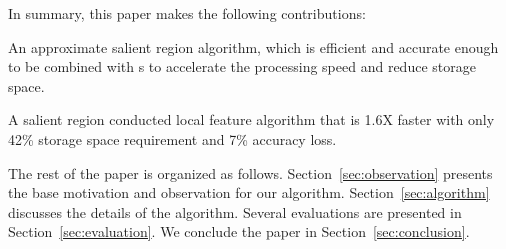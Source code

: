 In summary, this paper makes the following contributions:
\squishlist
\item An approximate salient region algorithm, which is efficient and accurate enough to be combined with {\lfea}s to accelerate the processing speed and reduce storage space.

\item A salient region conducted local feature algorithm that is 1.6X faster with only 42\% storage space requirement and 7\% accuracy loss.
\squishend

The rest of the paper is organized as follows. Section~\ref{sec:observation} presents the base motivation and observation for our algorithm. Section~\ref{sec:algorithm} discusses the details of the algorithm. Several evaluations are presented in Section~\ref{sec:evaluation}. We conclude the paper in Section~\ref{sec:conclusion}.
